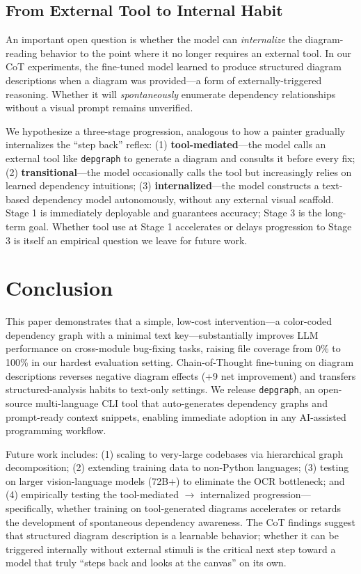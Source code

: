 \documentclass[11pt,a4paper]{article}
\begin{document}
\subsection{From External Tool to Internal Habit}
An important open question is whether the model can \textit{internalize} the diagram-reading behavior to the point where it no longer requires an external tool. In our CoT experiments, the fine-tuned model learned to produce structured diagram descriptions when a diagram was provided---a form of externally-triggered reasoning. Whether it will \textit{spontaneously} enumerate dependency relationships without a visual prompt remains unverified.

We hypothesize a three-stage progression, analogous to how a painter gradually internalizes the ``step back'' reflex: (1) \textbf{tool-mediated}---the model calls an external tool like \texttt{depgraph} to generate a diagram and consults it before every fix; (2) \textbf{transitional}---the model occasionally calls the tool but increasingly relies on learned dependency intuitions; (3) \textbf{internalized}---the model constructs a text-based dependency model autonomously, without any external visual scaffold. Stage 1 is immediately deployable and guarantees accuracy; Stage 3 is the long-term goal. Whether tool use at Stage 1 accelerates or delays progression to Stage 3 is itself an empirical question we leave for future work.

\section{Conclusion}

This paper demonstrates that a simple, low-cost intervention---a color-coded dependency graph with a minimal text key---substantially improves LLM performance on cross-module bug-fixing tasks, raising file coverage from 0\% to 100\% in our hardest evaluation setting. Chain-of-Thought fine-tuning on diagram descriptions reverses negative diagram effects (+9 net improvement) and transfers structured-analysis habits to text-only settings. We release \texttt{depgraph}, an open-source multi-language CLI tool that auto-generates dependency graphs and prompt-ready context snippets, enabling immediate adoption in any AI-assisted programming workflow.

Future work includes: (1) scaling to very-large codebases via hierarchical graph decomposition; (2) extending training data to non-Python languages; (3) testing on larger vision-language models (72B+) to eliminate the OCR bottleneck; and (4) empirically testing the tool-mediated $\rightarrow$ internalized progression---specifically, whether training on tool-generated diagrams accelerates or retards the development of spontaneous dependency awareness. The CoT findings suggest that structured diagram description is a learnable behavior; whether it can be triggered internally without external stimuli is the critical next step toward a model that truly ``steps back and looks at the canvas'' on its own.
\end{document}
